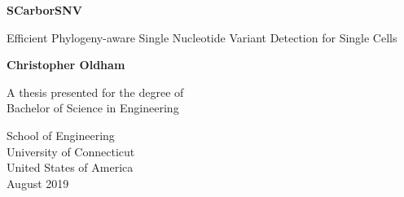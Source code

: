 \begin{titlepage}
   \begin{center}
       \vspace*{1cm}
 
       \Huge
       \textbf{SCarborSNV}
 
       \LARGE
       \vspace{0.5cm}
       Efficient Phylogeny-aware Single Nucleotide Variant Detection for Single Cells
 
       \vspace{1.5cm}
 
       \textbf{Christopher Oldham}
 
       \vfill
 
       \Large
       A thesis presented for the degree of\\
       Bachelor of Science in Engineering
 
       \vspace{0.8cm}
 
 
       School of Engineering\\
       University of Connecticut\\
       United States of America\\
       August 2019
 
   \end{center}
\end{titlepage}
